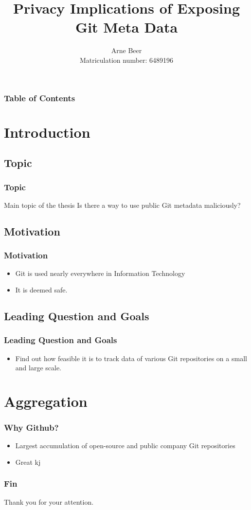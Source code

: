 \documentclass{beamer}
\title[Privacy Implications of Exposing Git Metadata]
{Privacy Implications of Exposing Git Meta Data}
\author[Beer]{Arne Beer \\ \footnotesize Matriculation number: 6489196}
\institute[University of Hamburg]{
    Department of Computer Science\\
    University of Hamburg
}
\begin{document}
\frame{\titlepage}
\begin{frame}
    \frametitle{Table of Contents}
    \footnotesize
    \tableofcontents
\end{frame}

\section{Introduction}

\subsection{Topic}
\begin{frame}
    \frametitle{Topic}
    \begin{block}{Main topic of the thesis}
        Is there a way to use public Git metadata maliciously?
    \end{block}
\end{frame}

\subsection{Motivation}
\begin{frame}
    \frametitle{Motivation}
    \begin{itemize}
        \item Git is used nearly everywhere in Information Technology
        \item It is deemed safe.
    \end{itemize}
\end{frame}

\subsection{Leading Question and Goals}
\begin{frame}
    \frametitle{Leading Question and Goals}
    \begin{itemize}
        \item Find out how feasible it is to track data of various Git repositories on a small and large scale.
    \end{itemize}
\end{frame}

\section{Aggregation}
\begin{frame}
    \frametitle{Why Github?}
    \begin{itemize}
        \item Largest accumulation of open-source and public company Git repositories
        \item Great kj
    \end{itemize}
\end{frame}

\begin{frame}
    \frametitle{Fin}
    Thank you for your attention.
\end{frame}
\end{document}
